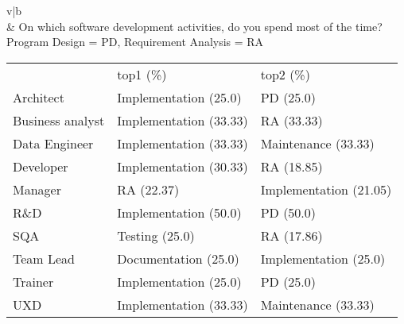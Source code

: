 \begin{table}[htbp]
\begin{tabularx}{\textwidth}{v|b}
{        }
        \\  & On which software development activities, do you spend most of the time?\newline Program Design = PD, Requirement Analysis = RA
        {
        \begin{tabularx}{0.92\textwidth}{yyy}
        \\
         & top1 (\%) & top2 (\%) \\
        Architect & Implementation (25.0)  & PD (25.0)  \\
        Business analyst & Implementation (33.33)  & RA (33.33)  \\
        Data Engineer & Implementation (33.33)  & Maintenance (33.33)  \\
        Developer & Implementation (30.33)  & RA (18.85)  \\
        Manager & RA (22.37)  & Implementation (21.05)  \\
        R\&D & Implementation (50.0)  & PD (50.0)  \\
        SQA & Testing (25.0)  & RA (17.86)  \\
        Team Lead & Documentation (25.0)  & Implementation (25.0)  \\
        Trainer & Implementation (25.0)  & PD (25.0)  \\
        UXD & Implementation (33.33)  & Maintenance (33.33)  \\
        \end{tabularx}
        }\\ \hline
    \end{tabularx}
    \label{table:analysis by profession part1}
\end{table}